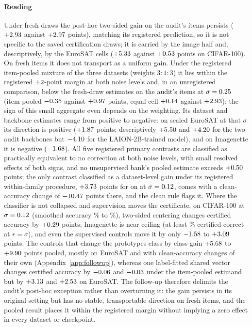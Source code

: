 \paragraph{Reading}
Under fresh draws the post-hoc two-sided gain on the audit's items persists
($+2.93$ against $+2.97$ points), matching its registered
prediction, so it is not specific to the saved certification draws; it is
carried by the image half and, descriptively, by the EuroSAT cells
($+5.33$ against $+0.53$ points on CIFAR-100). On fresh items
it does not transport as a uniform gain. Under the registered item-pooled
mixture of the three datasets (weights $3{:}1{:}3$) it lies within the
registered $\pm2$-point margin at both noise levels and, in an unregistered
comparison, below the fresh-draw estimates on the audit's items at
$\sigma=0.25$ (item-pooled $-0.35$ against
$+0.97$ points, equal-cell $+0.14$ against
$+2.93$); the sign of this small aggregate even depends on the
weighting. Its dataset and backbone estimates range from positive to negative:
on sealed EuroSAT at that $\sigma$ its direction is positive
($+1.87$ points; descriptively $+5.50$ and
$+4.20$ for the two audit backbones but
$-4.10$ for the LAION-2B-trained model), and on Imagenette it
is negative ($-1.68$). All five registered primary contrasts
are classified as practically equivalent to no correction at both noise
levels, with small resolved effects of both signs, and no unsupervised bank's
pooled estimate exceeds $+0.50$ points; the only contrast classified
as a dataset-level gain under its registered within-family procedure,
$+3.73$ points for \FUQSixDsMaxId{} on \FUQSixDsMaxData{} at
$\sigma=0.12$, comes with a clean-accuracy change of
$-10.47$ points there, and the clean rule flags it. Where the classifier is not collapsed and supervision
moves the certificate, on CIFAR-100 at $\sigma=0.12$ (smoothed accuracy
\FUQSevenCifarLowSmoothedLo\% to \FUQSevenCifarLowSmoothedHi\%), two-sided
centering changes certified accuracy by $+0.29$ points; Imagenette
is near ceiling (at least \FUQSevenImagenetteStdCALo\% certified correct at
$r=\sigma$), and even the supervised controls move it by only
$-1.58$ to $+3.09$ points. The controls
that change the prototypes class by class gain $+5.68$ to
$+9.90$ points pooled, mostly on EuroSAT and with clean-accuracy
changes of their own (Appendix~\ref{app:followup}), whereas one label-fitted
shared vector changes certified accuracy by $-0.06$ and
$-0.03$ under the item-pooled estimand but by
$+3.13$ and $+2.53$ on EuroSAT. The
follow-up therefore delimits the audit's post-hoc exception rather than
overturning it: the gain persists in its original setting but has no stable,
transportable direction on fresh items, and the pooled result places it
within the registered margin without implying a zero effect in every dataset
or checkpoint.
